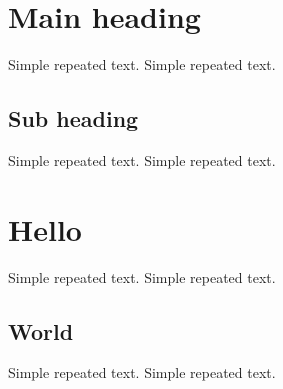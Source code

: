 \documentclass{article}
\begin{document}
\section{Main heading}

Simple repeated text.
Simple repeated text.

\subsection{Sub heading}

Simple repeated text.
Simple repeated text.

\section{Hello}

Simple repeated text.
Simple repeated text.

\subsection{World}

Simple repeated text.
Simple repeated text.
\end{document}
